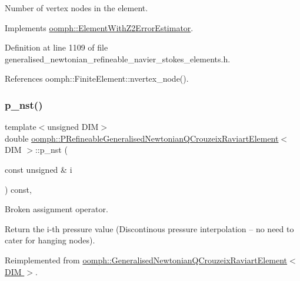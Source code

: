 Number of vertex nodes in the element. 



Implements \hyperlink{classoomph_1_1ElementWithZ2ErrorEstimator_a19495a0e77ef4ff35f15fdf7913b4077}{oomph\+::\+Element\+With\+Z2\+Error\+Estimator}.



Definition at line 1109 of file generalised\+\_\+newtonian\+\_\+refineable\+\_\+navier\+\_\+stokes\+\_\+elements.\+h.



References oomph\+::\+Finite\+Element\+::nvertex\+\_\+node().

\mbox{\label{classoomph_1_1PRefineableGeneralisedNewtonianQCrouzeixRaviartElement_a2aa0981d2fccc40fe3b94763901ff844}} 
\subsubsection{\texorpdfstring{p\+\_\+nst()}{p\_nst()}\hspace{0.1cm}{\footnotesize\ttfamily [1/2]}}
{\footnotesize\ttfamily template$<$unsigned D\+IM$>$ \\
double \hyperlink{classoomph_1_1PRefineableGeneralisedNewtonianQCrouzeixRaviartElement}{oomph\+::\+P\+Refineable\+Generalised\+Newtonian\+Q\+Crouzeix\+Raviart\+Element}$<$ D\+IM $>$\+::p\+\_\+nst (\begin{DoxyParamCaption}\item[{const unsigned \&}]{i }\end{DoxyParamCaption}) const\hspace{0.3cm}{\ttfamily [inline]}, {\ttfamily [virtual]}}



Broken assignment operator. 

Return the i-\/th pressure value (Discontinous pressure interpolation -- no need to cater for hanging nodes). 

Reimplemented from \hyperlink{classoomph_1_1GeneralisedNewtonianQCrouzeixRaviartElement_aa4293ea7acc0f6bc4cd9e7fe2248b726}{oomph\+::\+Generalised\+Newtonian\+Q\+Crouzeix\+Raviart\+Element$<$ D\+I\+M $>$}.



